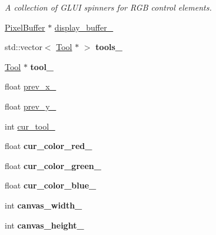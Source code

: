 \begin{DoxyCompactItemize}
\begin{tabbing}
\end{tabbing}\begin{DoxyCompactList}\small\item\em A collection of G\+L\+UI spinners for R\+GB control elements. \end{DoxyCompactList}\item 
\hyperlink{classimage__tools_1_1PixelBuffer}{Pixel\+Buffer} $\ast$ \hyperlink{classimage__tools_1_1FlashPhotoApp_ad0a08d5606cfc5aa02412303147c612d}{display\+\_\+buffer\+\_\+}
\item 
std\+::vector$<$ \hyperlink{classimage__tools_1_1Tool}{Tool} $\ast$ $>$ {\bfseries tools\+\_\+}\hypertarget{classimage__tools_1_1FlashPhotoApp_a65af6e1e1747fa4cc9e5fdaeb82bd073}{}\label{classimage__tools_1_1FlashPhotoApp_a65af6e1e1747fa4cc9e5fdaeb82bd073}

\item 
\hyperlink{classimage__tools_1_1Tool}{Tool} $\ast$ {\bfseries tool\+\_\+}\hypertarget{classimage__tools_1_1FlashPhotoApp_ae01163e2223698958e2c1365b460ad36}{}\label{classimage__tools_1_1FlashPhotoApp_ae01163e2223698958e2c1365b460ad36}

\item 
float \hyperlink{classimage__tools_1_1FlashPhotoApp_a811146334785c6d0ab06e7d836aff72d}{prev\+\_\+x\+\_\+}
\item 
float \hyperlink{classimage__tools_1_1FlashPhotoApp_afeae20c1f13f61db0577f9c88aadfd01}{prev\+\_\+y\+\_\+}
\item 
int \hyperlink{classimage__tools_1_1FlashPhotoApp_a1aa3a6b34a072dd47f6b7ab150a52710}{cur\+\_\+tool\+\_\+}
\item 
float {\bfseries cur\+\_\+color\+\_\+red\+\_\+}\hypertarget{classimage__tools_1_1FlashPhotoApp_a1f05e2dcc771bb2b915fe5713cafd06c}{}\label{classimage__tools_1_1FlashPhotoApp_a1f05e2dcc771bb2b915fe5713cafd06c}

\item 
float {\bfseries cur\+\_\+color\+\_\+green\+\_\+}\hypertarget{classimage__tools_1_1FlashPhotoApp_a06056579211bf21a52db97fdd9cd1729}{}\label{classimage__tools_1_1FlashPhotoApp_a06056579211bf21a52db97fdd9cd1729}

\item 
float {\bfseries cur\+\_\+color\+\_\+blue\+\_\+}\hypertarget{classimage__tools_1_1FlashPhotoApp_a87cfd54779dd53c6f4fd387984251ebc}{}\label{classimage__tools_1_1FlashPhotoApp_a87cfd54779dd53c6f4fd387984251ebc}

\item 
int {\bfseries canvas\+\_\+width\+\_\+}\hypertarget{classimage__tools_1_1FlashPhotoApp_a5620da17bf618b0f9b21ec2c08d81da5}{}\label{classimage__tools_1_1FlashPhotoApp_a5620da17bf618b0f9b21ec2c08d81da5}

\item 
int {\bfseries canvas\+\_\+height\+\_\+}\hypertarget{classimage__tools_1_1FlashPhotoApp_abd6ffc8be7663cd5fb3896c4f98b66ea}{}\label{classimage__tools_1_1FlashPhotoApp_abd6ffc8be7663cd5fb3896c4f98b66ea}

\end{DoxyCompactItemize}
